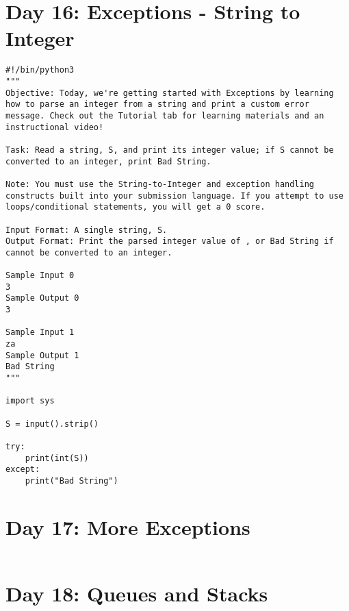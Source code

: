 \documentclass[11pt,a4paper]{article}
\begin{document}
\newpage
\section{Day 16: Exceptions - String to Integer}
\begin{lstlisting}
#!/bin/python3
"""
Objective: Today, we're getting started with Exceptions by learning how to parse an integer from a string and print a custom error message. Check out the Tutorial tab for learning materials and an instructional video!

Task: Read a string, S, and print its integer value; if S cannot be converted to an integer, print Bad String.

Note: You must use the String-to-Integer and exception handling constructs built into your submission language. If you attempt to use loops/conditional statements, you will get a 0 score.

Input Format: A single string, S.
Output Format: Print the parsed integer value of , or Bad String if  cannot be converted to an integer.

Sample Input 0
3
Sample Output 0
3

Sample Input 1
za
Sample Output 1
Bad String
"""

import sys

S = input().strip()

try:
    print(int(S))
except:
    print("Bad String")
\end{lstlisting}





















\newpage
\section{Day 17: More Exceptions}
\begin{lstlisting}
\end{lstlisting}

\newpage
\section{Day 18: Queues and Stacks}
\begin{lstlisting}
\end{lstlisting}
\end{document}
